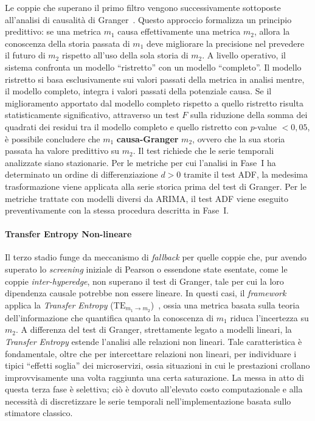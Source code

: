 Le coppie che superano il primo filtro vengono successivamente sottoposte all'analisi di causalità
di Granger~\cite{granger1969}. Questo approccio formalizza un principio predittivo: se una metrica
$m_1$ causa effettivamente una metrica $m_2$, allora la conoscenza della storia passata di $m_1$
deve migliorare la precisione nel prevedere il futuro di $m_2$ rispetto all'uso della sola storia
di $m_2$. A livello operativo, il sistema confronta un modello ``ristretto'' con un modello
``completo''. Il modello ristretto si basa esclusivamente sui valori passati della metrica in analisi
mentre, il modello completo, integra i valori passati della potenziale causa. Se il miglioramento
apportato dal modello completo rispetto a quello ristretto risulta statisticamente significativo,
attraverso un test $F$ sulla riduzione della somma dei quadrati dei residui tra il modello completo
e quello ristretto con $p$-value $< 0{,}05$, è possibile concludere che $m_1$ \textbf{causa-Granger}
$m_2$, ovvero che la sua storia passata ha valore predittivo su $m_2$.
Il test richiede che le serie temporali analizzate siano stazionarie. Per le metriche per cui
l'analisi in Fase~I ha determinato un ordine di differenziazione $d > 0$ tramite il test \gls{ADF},
la medesima trasformazione viene applicata alla serie storica prima del test di Granger. Per le
metriche trattate con modelli diversi da ARIMA, il test \gls{ADF} viene eseguito preventivamente
con la stessa procedura descritta in Fase~I.

\paragraph{Transfer Entropy Non-lineare}

Il terzo stadio funge da meccanismo di \textit{fallback} per quelle coppie che, pur avendo
superato lo \textit{screening} iniziale di Pearson o essendone state esentate, come le coppie
\textit{inter-hyperedge}, non superano il test di Granger, tale per cui la loro dipendenza causale
potrebbe non essere lineare. In questi casi, il \textit{framework} applica la \textit{Transfer
Entropy} ($\text{TE}_{m_1 \to m_2}$)~\cite{schreiber2000}, ossia una metrica basata sulla teoria
dell'informazione che quantifica quanto la conoscenza di $m_1$ riduca l'incertezza su $m_2$. A
differenza del test di Granger, strettamente legato a modelli lineari, la \textit{Transfer Entropy}
estende l'analisi alle relazioni non lineari. Tale caratteristica è fondamentale, oltre che per
intercettare relazioni non lineari, per individuare i tipici ``effetti soglia'' dei microservizi,
ossia situazioni in cui le prestazioni crollano improvvisamente una volta raggiunta una certa
saturazione. La messa in atto di questa terza fase è selettiva; ciò è dovuto all'elevato costo
computazionale e alla necessità di discretizzare le serie temporali nell'implementazione basata
sullo stimatore classico.

